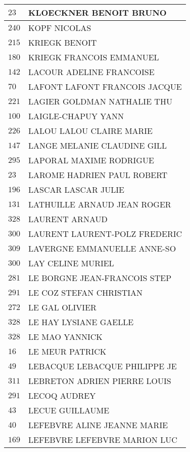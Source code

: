 \begin{xltabular}{\linewidth}{|l|X|}
    $23$ & KLOECKNER BENOIT BRUNO \\
    \hline
    $240$ & KOPF NICOLAS \\
    \hline
    $215$ & KRIEGK BENOIT \\
    \hline
    $180$ & KRIEGK FRANCOIS EMMANUEL \\
    \hline
    $142$ & LACOUR ADELINE FRANCOISE \\
    \hline
    $70$ & LAFONT LAFONT FRANCOIS JACQUE \\
    \hline
    $221$ & LAGIER GOLDMAN NATHALIE THU \\
    \hline
    $100$ & LAIGLE-CHAPUY YANN \\
    \hline
    $226$ & LALOU LALOU CLAIRE MARIE \\
    \hline
    $147$ & LANGE MELANIE CLAUDINE GILL \\
    \hline
    $295$ & LAPORAL MAXIME RODRIGUE \\
    \hline
    $23$ & LAROME HADRIEN PAUL ROBERT \\
    \hline
    $196$ & LASCAR LASCAR JULIE \\
    \hline
    $131$ & LATHUILLE ARNAUD JEAN ROGER \\
    \hline
    $328$ & LAURENT ARNAUD \\
    \hline
    $300$ & LAURENT LAURENT-POLZ FREDERIC \\
    \hline
    $309$ & LAVERGNE EMMANUELLE ANNE-SO \\
    \hline
    $300$ & LAY CELINE MURIEL \\
    \hline
    $281$ & LE BORGNE JEAN-FRANCOIS STEP \\
    \hline
    $291$ & LE COZ STEFAN CHRISTIAN \\
    \hline
    $272$ & LE GAL OLIVIER \\
    \hline
    $328$ & LE HAY LYSIANE GAELLE \\
    \hline
    $328$ & LE MAO YANNICK \\
    \hline
    $16$ & LE MEUR PATRICK \\
    \hline
    $49$ & LEBACQUE LEBACQUE PHILIPPE JE \\
    \hline
    $311$ & LEBRETON ADRIEN PIERRE LOUIS \\
    \hline
    $291$ & LECOQ AUDREY \\
    \hline
    $43$ & LECUE GUILLAUME \\
    \hline
    $40$ & LEFEBVRE ALINE JEANNE MARIE \\
    \hline
    $169$ & LEFEBVRE LEFEBVRE MARION LUC \\

\end{xltabular}
